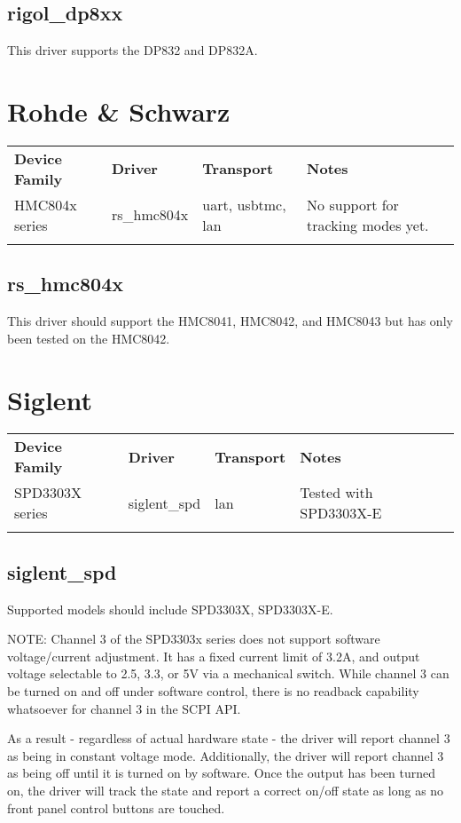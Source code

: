 \subsection{rigol\_dp8xx}

This driver supports the DP832 and DP832A.

\section{Rohde \& Schwarz}

\begin{tabularx}{16cm}{lllX}
\thickhline
\textbf{Device Family} & \textbf{Driver} & \textbf{Transport} & \textbf{Notes} \\
\thickhline
HMC804x series & rs\_hmc804x & uart, usbtmc, lan & No support for tracking modes yet.\\
\thickhline
\end{tabularx}

\subsection{rs\_hmc804x}

This driver should support the HMC8041, HMC8042, and HMC8043 but has only been tested on the HMC8042.

\section{Siglent}

\begin{tabularx}{16cm}{lllX}
\thickhline
\textbf{Device Family} & \textbf{Driver} & \textbf{Transport} & \textbf{Notes} \\
\thickhline
SPD3303X series & siglent\_spd & lan & Tested with SPD3303X-E\\
\thickhline
\end{tabularx}

\subsection{siglent\_spd}

Supported models should include SPD3303X, SPD3303X-E.

NOTE: Channel 3 of the SPD3303x series does not support software voltage/current adjustment. It has a fixed current
limit of 3.2A, and output voltage selectable to 2.5, 3.3, or 5V via a mechanical switch. While channel 3 can be turned
on and off under software control, there is no readback capability whatsoever for channel 3 in the SCPI API.

As a result - regardless of actual hardware state - the driver will report channel 3 as being in constant voltage mode.
Additionally, the driver will report channel 3 as being off until it is turned on by software. Once the output has been
turned on, the driver will track the state and report a correct on/off state as long as no front panel control buttons
are touched.
